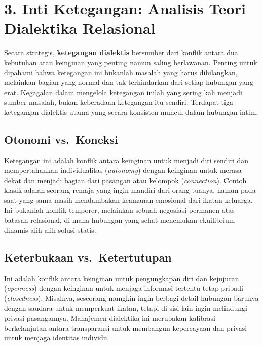 \documentclass[
  letterpaper,
  DIV=11,
  numbers=noendperiod]{scrreprt}
\begin{document}
\section{\texorpdfstring{\textbf{3. Inti Ketegangan: Analisis Teori
Dialektika
Relasional}}{3. Inti Ketegangan: Analisis Teori Dialektika Relasional}}\label{inti-ketegangan-analisis-teori-dialektika-relasional}

Secara strategis, \textbf{ketegangan dialektis} bersumber dari konflik
antara dua kebutuhan atau keinginan yang penting namun saling
berlawanan. Penting untuk dipahami bahwa ketegangan ini bukanlah masalah
yang harus dihilangkan, melainkan bagian yang normal dan tak
terhindarkan dari setiap hubungan yang erat. Kegagalan dalam mengelola
ketegangan inilah yang sering kali menjadi sumber masalah, bukan
keberadaan ketegangan itu sendiri. Terdapat tiga ketegangan dialektis
utama yang secara konsisten muncul dalam hubungan intim.

\subsection{\texorpdfstring{\textbf{Otonomi
vs.~Koneksi}}{Otonomi vs.~Koneksi}}\label{otonomi-vs.-koneksi}

Ketegangan ini adalah konflik antara keinginan untuk menjadi diri
sendiri dan mempertahankan individualitas (\emph{autonomy}) dengan
keinginan untuk merasa dekat dan menjadi bagian dari pasangan atau
kelompok (\emph{connection}). Contoh klasik adalah seorang remaja yang
ingin mandiri dari orang tuanya, namun pada saat yang sama masih
mendambakan keamanan emosional dari ikatan keluarga. Ini bukanlah
konflik temporer, melainkan sebuah negosiasi permanen atas batasan
relasional, di mana hubungan yang sehat menemukan ekuilibrium dinamis
alih-alih solusi statis.

\subsection{\texorpdfstring{\textbf{Keterbukaan
vs.~Ketertutupan}}{Keterbukaan vs.~Ketertutupan}}\label{keterbukaan-vs.-ketertutupan}

Ini adalah konflik antara keinginan untuk pengungkapan diri dan
kejujuran (\emph{openness}) dengan keinginan untuk menjaga informasi
tertentu tetap pribadi (\emph{closedness}). Misalnya, seseorang mungkin
ingin berbagi detail hubungan barunya dengan saudara untuk memperkuat
ikatan, tetapi di sisi lain ingin melindungi privasi pasangannya.
Manajemen dialektika ini merupakan kalibrasi berkelanjutan antara
transparansi untuk membangun kepercayaan dan privasi untuk menjaga
identitas individu.
\end{document}
